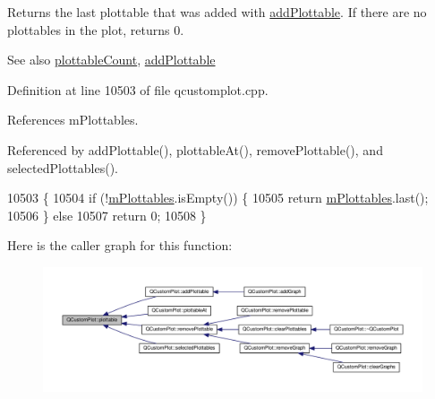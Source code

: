 Returns the last plottable that was added with \hyperlink{class_q_custom_plot_ab7ad9174f701f9c6f64e378df77927a6}{add\+Plottable}. If there are no plottables in the plot, returns 0.

\begin{DoxySeeAlso}{See also}
\hyperlink{class_q_custom_plot_a2dbfbf15dc38713f9a1c445a3dd2e989}{plottable\+Count}, \hyperlink{class_q_custom_plot_ab7ad9174f701f9c6f64e378df77927a6}{add\+Plottable} 
\end{DoxySeeAlso}


Definition at line 10503 of file qcustomplot.\+cpp.



References m\+Plottables.



Referenced by add\+Plottable(), plottable\+At(), remove\+Plottable(), and selected\+Plottables().


\begin{DoxyCode}
10503                                              \{
10504   \textcolor{keywordflow}{if} (!\hyperlink{class_q_custom_plot_a4b6c694fbdb2f201626f71eff2d1694e}{mPlottables}.isEmpty()) \{
10505     \textcolor{keywordflow}{return} \hyperlink{class_q_custom_plot_a4b6c694fbdb2f201626f71eff2d1694e}{mPlottables}.last();
10506   \} \textcolor{keywordflow}{else}
10507     \textcolor{keywordflow}{return} 0;
10508 \}
\end{DoxyCode}


Here is the caller graph for this function\+:\nopagebreak
\begin{figure}[H]
\begin{center}
\leavevmode
\includegraphics[width=350pt]{class_q_custom_plot_adea38bdc660da9412ba69fb939031567_icgraph}
\end{center}
\end{figure}


\hypertarget{class_q_custom_plot_ac1d1bc6ae4e13616fb02cef6d9e2188e}{}
